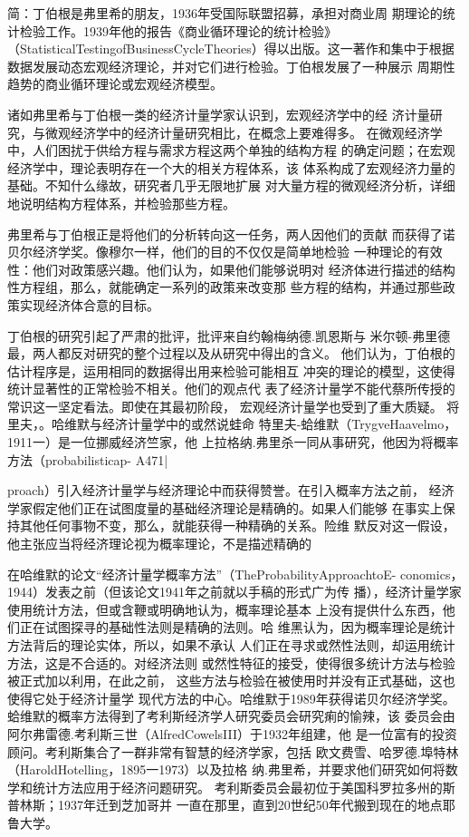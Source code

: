 简：丁伯根是弗里希的朋友，1936年受国际联盟招募，承担对商业周
期理论的统计检验工作。1939年他的报告《商业循环理论的统计检验》
（StatisticalTestingofBusinessCycleTheories）得以出版。这一著作和集中于根据
数据发展动态宏观经济理论，并对它们进行检验。丁伯根发展了一种展示
周期性趋势的商业循环理论或宏观经济模型。

诸如弗里希与丁伯根一类的经济计量学家认识到，宏观经济学中的经
济计量研究，与微观经济学中的经济计量研究相比，在概念上要难得多。
在微观经济学中，人们困扰于供给方程与需求方程这两个单独的结构方程
的确定问题；在宏观经济学中，理论表明存在一个大的相关方程体系，该
体系构成了宏观经济力量的基础。不知什么缘故，研究者几乎无限地扩展
对大量方程的微观经济分析，详细地说明结构方程体系，并检验那些方程。

弗里希与丁伯根正是将他们的分析转向这一任务，两人因他们的贡献
而获得了诺贝尔经济学奖。像穆尔一样，他们的目的不仅仅是简单地检验
一种理论的有效性：他们对政策感兴趣。他们认为，如果他们能够说明对
经济体进行描述的结构性方程组，那么，就能确定一系列的政策来改变那
些方程的结构，并通过那些政策实现经济体合意的目标。

丁伯根的研究引起了严肃的批评，批评来自约翰梅纳德.凯恩斯与
米尔顿-弗里德最，两人都反对研究的整个过程以及从研究中得出的含义。
他们认为，丁伯根的估计程序是，运用相同的数据得出用来检验可能相互
冲突的理论的模型，这使得统计显著性的正常检验不相关。他们的观点代
表了经济计量学不能代蔡所传授的常识这一坚定看法。即使在其最初阶段，
宏观经济计量学也受到了重大质疑。
将里夫，。哈维默与经济计量学中的或然说蛙命
特里夫-蛤维默（TrygveHaavelmo，1911一）是一位挪威经济竺家，他
上拉格纳.弗里杀一同从事研究，他因为将概率方法（probabilisticap-
A471|

proach）引入经济计量学与经济理论中而获得赞誉。在引入概率方法之前，
经济学家假定他们正在试图度量的基础经济理论是精确的。如果人们能够
在事实上保持其他任何事物不变，那么，就能获得一种精确的关系。险维
默反对这一假设，他主张应当将经济理论视为概率理论，不是描述精确的

在哈维默的论文“经济计量学概率方法”（TheProbabilityApproachtoE-
conomics，1944）发表之前（但该论文1941年之前就以手稿的形式广为传
播），经济计量学家使用统计方法，但或含鞭或明确地认为，概率理论基本
上没有提供什么东西，他们正在试图探寻的基础性法则是精确的法则。哈
维黑认为，因为概率理论是统计方法背后的理论实体，所以，如果不承认
人们正在寻求或然性法则，却运用统计方法，这是不合适的。对经济法则
或然性特征的接受，使得很多统计方法与检验被正式加以利用，在此之前，
这些方法与检验在被使用时并没有正式基础，这也使得它处于经济计量学
现代方法的中心。哈维默于1989年获得诺贝尔经济学奖。
蛤维默的概率方法得到了考利斯经济学人研究委员会研究痢的愉辣，该
委员会由阿尔弗雷德.考利斯三世（AlfredCowelsIII）于1932年组建，他
是一位富有的投资顾问。考利斯集合了一群非常有智慧的经济学家，包括
欧文费雪、哈罗德.埠特林（HaroldHotelling，1895一1973）以及拉格
纳.弗里希，并要求他们研究如何将数学和统计方法应用于经济问题研究。
考利斯委员会最初位于美国科罗拉多州的斯普林斯；1937年迁到芝加哥并
一直在那里，直到20世纪50年代搬到现在的地点耶鲁大学。

